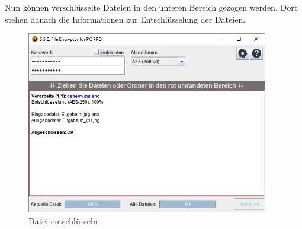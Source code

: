 \documentclass[12pt,a4paper]{scrreprt}
\begin{document}
\noindent Nun können verschlüsselte Dateien in den unteren Bereich gezogen werden. Dort stehen danach die Informationen zur Entschlüsselung der Dateien.

\begin{figure}[h]
\begin{center}
\includegraphics[width=300pt]{media/sse3.png}
\caption{Datei entschlüsseln}
\label{sse3}
\end{center}
\end{figure}
\end{document}
